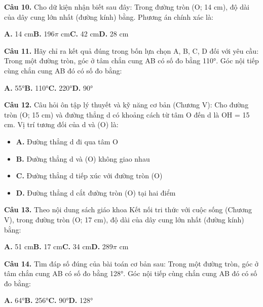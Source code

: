 \documentclass[11pt,a4paper]{article}
\begin{document}
\textbf{\color{primary} Câu 10.} Cho dữ kiện nhận biết sau đây: Trong đường tròn (O; 14 cm), độ dài của dây cung lớn nhất (đường kính) bằng. Phương án chính xác là:\par
\hspace*{1.5em}\textbf{A.} 14 cm\quad\quad \textbf{B.} 196$\pi$ cm\quad\quad \textbf{C.} 42 cm\quad\quad \textbf{D.} 28 cm\par\vspace{2pt}
\textbf{\color{primary} Câu 11.} Hãy chỉ ra kết quả đúng trong bốn lựa chọn A, B, C, D đối với yêu cầu: Trong một đường tròn, góc ở tâm chắn cung AB có số đo bằng 110°. Góc nội tiếp cùng chắn cung AB đó có số đo bằng:\par
\hspace*{1.5em}\textbf{A.} 55°\quad\quad \textbf{B.} 110°\quad\quad \textbf{C.} 220°\quad\quad \textbf{D.} 90°\par\vspace{2pt}
\textbf{\color{primary} Câu 12.} Câu hỏi ôn tập lý thuyết và kỹ năng cơ bản (Chương V): Cho đường tròn (O; 15 cm) và đường thẳng d có khoảng cách từ tâm O đến d là OH = 15 cm. Vị trí tương đối của d và (O) là:\par
\begin{itemize}\setlength{\itemsep}{1pt}\setlength{\parskip}{0pt}
  \item[] \textbf{A.} Đường thẳng d đi qua tâm O
  \item[] \textbf{B.} Đường thẳng d và (O) không giao nhau
  \item[] \textbf{C.} Đường thẳng d tiếp xúc với đường tròn (O)
  \item[] \textbf{D.} Đường thẳng d cắt đường tròn (O) tại hai điểm
\end{itemize}\vspace{2pt}
\textbf{\color{primary} Câu 13.} Theo nội dung sách giáo khoa Kết nối tri thức với cuộc sống (Chương V), trong đường tròn (O; 17 cm), độ dài của dây cung lớn nhất (đường kính) bằng:\par
\hspace*{1.5em}\textbf{A.} 51 cm\quad\quad \textbf{B.} 17 cm\quad\quad \textbf{C.} 34 cm\quad\quad \textbf{D.} 289$\pi$ cm\par\vspace{2pt}
\textbf{\color{primary} Câu 14.} Tìm đáp số đúng của bài toán cơ bản sau: Trong một đường tròn, góc ở tâm chắn cung AB có số đo bằng 128°. Góc nội tiếp cùng chắn cung AB đó có số đo bằng:\par
\hspace*{1.5em}\textbf{A.} 64°\quad\quad \textbf{B.} 256°\quad\quad \textbf{C.} 90°\quad\quad \textbf{D.} 128°\par\vspace{2pt}
\end{document}

